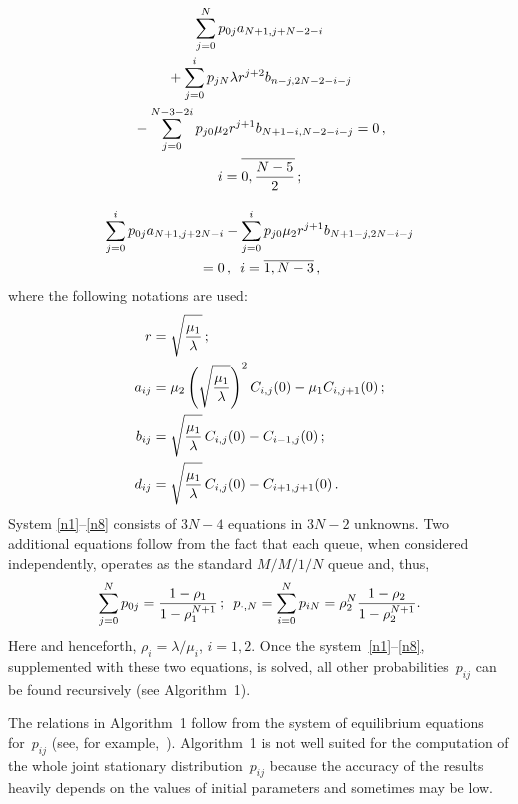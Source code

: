 \begin{multicols}{2}
\vspace*{-14pt}

\noindent
\begin{multline}
\label{n7}
\sum\limits_{j=0}^N p_{0j} a_{N+1,j+N-2-i} \\[-1pt]
{}+ \sum\limits_{j=0}^i p_{jN} \lambda r^{j+2} b_{n-j,2N-2-i-j} 
\\{}-
\sum\limits_{j=0}^{N-3-2i} p_{j0} \mu_2 r^{j+1} b_{N+1-i,N-2-i-j}=0\,,\\
i=\overline{0,\displaystyle\frac{\displaystyle N-5\mathstrut}{\displaystyle 2\mathstrut}}\,;
\end{multline}

\vspace*{-14pt}

\noindent
\begin{multline}
\label{n8}
\sum\limits_{j=0}^i p_{0j} a_{N+1,j+2N-i} 
- \sum\limits_{j=0}^i p_{j0} \mu_2 r^{j+1} b_{N+1-j,2N-i-j}\\
{}=0\,,\enskip
 i=\overline{1,N-3}\,,
\end{multline}
where the following notations are used:
\begin{align*}
r&= \sqrt{\displaystyle\frac{\displaystyle \mu_1\mathstrut}{\displaystyle \lambda\mathstrut}}\,; \\
a_{ij}&=\mu_2\left(\sqrt{\displaystyle\frac{\displaystyle \mu_1\mathstrut}{\displaystyle \lambda\mathstrut}}\right)^2 C_{i,j} (0) -\mu_1C_{i,j+1}(0)\,;
\\
b_{ij}&=\sqrt{\displaystyle\frac{\displaystyle \mu_1\mathstrut}{\displaystyle \lambda\mathstrut}}\, C_{i,j}(0)-C_{i-1,j}(0)\,;\\
d_{ij}&=\sqrt{\displaystyle\frac{\displaystyle \mu_1\mathstrut}{\displaystyle \lambda\mathstrut}}\, C_{i,j}(0)-C_{i+1,j+1}(0)\,.
\end{align*}
System \eqref{n1}--\eqref{n8} consists of $3N-4$
equations in $3N-2$ unknowns. Two additional equations
follow from the fact that each queue, when considered 
independently, operates as the standard $M/M/1/N$ queue
and, thus, 
$$
\sum\limits_{j=0}^N p_{0j} =\displaystyle\frac{\displaystyle 1-\rho_1\mathstrut}{\displaystyle 1- \rho_1^{N+1}\mathstrut}\,;
\enskip
p_{\cdot,N}=\sum\limits_{i=0}^N
p_{iN}=\rho_2^N \displaystyle\frac{\displaystyle 1-\rho_2\mathstrut}{\displaystyle 1- \rho_2^{N+1}\mathstrut}.
$$ 
Here and henceforth, $\rho_i=\lambda/\mu_i$, $i=1,2$.
Once the system~\eqref{n1}--\eqref{n8},
supplemented with these two equations, is solved,
all other probabilities~$p_{ij}$ can be found recursively 
(see Algorithm~1).




The relations in Algorithm~1 follow from the system 
of equilibrium equations for~$p_{ij}$ (see, for example,~\cite[p.~435]{orig1}). 
Algorithm~1 is not well suited 
for the computation of the 
whole joint stationary distribution~$p_{ij}$
because the accuracy of the results heavily depends
on the values of initial parameters and sometimes may be low.



\end{multicols}
